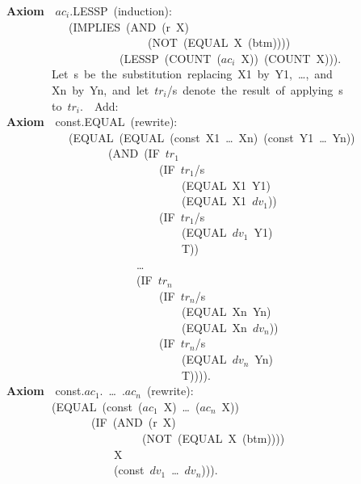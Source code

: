 \documentclass[10pt]{book}
\newenvironment{pubasis}{\begin{flushleft}}{\end{flushleft}}
\newcommand{\axiomordefinition}[1]{\vspace{6pt}\Large\textsf{\textbf{#1}}\normalsize}
\begin{document}
\begin{pubasis}
\axiomordefinition{Axiom}~~$ac_{i}$.LESSP~(induction):\\
~~~~~~~~~~~(IMPLIES~(AND~(r~X)\\
~~~~~~~~~~~~~~~~~~~~~~~~~(NOT~(EQUAL~X~(btm))))\\
~~~~~~~~~~~~~~~~~~~~(LESSP~(COUNT~($ac_{i}$~X))~(COUNT~X))).\\

~~~~~~~~Let~s~be~the~substitution~replacing~X1~by~Y1,~\ldots{},~and\\
~~~~~~~~Xn~by~Yn,~and~let~$tr_{i}$/s~denote~the~result~of~applying~s\\
~~~~~~~~to~$tr_{i}$.~~Add:\\

\axiomordefinition{Axiom}~~const.EQUAL~(rewrite):\\
~~~~~~~~~~~(EQUAL~(EQUAL~(const~X1~\ldots{}~Xn)~(const~Y1~\ldots{}~Yn))\\
~~~~~~~~~~~~~~~~~~(AND~(IF~$tr_{1}$\\
~~~~~~~~~~~~~~~~~~~~~~~~~~~(IF~$tr_{1}$/s\\
~~~~~~~~~~~~~~~~~~~~~~~~~~~~~~~(EQUAL~X1~Y1)\\
~~~~~~~~~~~~~~~~~~~~~~~~~~~~~~~(EQUAL~X1~$dv_{1}$))\\
~~~~~~~~~~~~~~~~~~~~~~~~~~~(IF~$tr_{1}$/s\\
~~~~~~~~~~~~~~~~~~~~~~~~~~~~~~~(EQUAL~$dv_{1}$~Y1)\\
~~~~~~~~~~~~~~~~~~~~~~~~~~~~~~~T))\\
~~~~~~~~~~~~~~~~~~~~~~~\ldots{}\\

~~~~~~~~~~~~~~~~~~~~~~~(IF~$tr_{n}$\\
~~~~~~~~~~~~~~~~~~~~~~~~~~~(IF~$tr_{n}$/s\\
~~~~~~~~~~~~~~~~~~~~~~~~~~~~~~~(EQUAL~Xn~Yn)\\
~~~~~~~~~~~~~~~~~~~~~~~~~~~~~~~(EQUAL~Xn~$dv_{n}$))\\
~~~~~~~~~~~~~~~~~~~~~~~~~~~(IF~$tr_{n}$/s\\
~~~~~~~~~~~~~~~~~~~~~~~~~~~~~~~(EQUAL~$dv_{n}$~Yn)\\
~~~~~~~~~~~~~~~~~~~~~~~~~~~~~~~T)))).\\

\axiomordefinition{Axiom}~~const.$ac_{1}$.~\ldots{}~.$ac_{n}$~(rewrite):\\
~~~~~~~~(EQUAL~(const~($ac_{1}$~X)~\ldots{}~($ac_{n}$~X))\\
~~~~~~~~~~~~~~~(IF~(AND~(r~X)\\
~~~~~~~~~~~~~~~~~~~~~~~~(NOT~(EQUAL~X~(btm))))\\
~~~~~~~~~~~~~~~~~~~X\\
~~~~~~~~~~~~~~~~~~~(const~$dv_{1}$~\ldots{}~$dv_{n}$))).\\


\end{pubasis}
\end{document}
